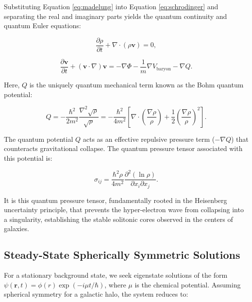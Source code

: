 Substituting Equation \ref{eq:madelung} into Equation \ref{eq:schrodinger} and separating the real and imaginary parts yields the quantum continuity and quantum Euler equations:

\begin{equation}
\frac{\partial \rho}{\partial t} + \nabla \cdot (\rho \mathbf{v}) = 0,
\label{eq:continuity}
\end{equation}

\begin{equation}
\frac{\partial \mathbf{v}}{\partial t} + (\mathbf{v} \cdot \nabla)\mathbf{v} = -\nabla \Phi - \frac{1}{m}\nabla V_{\text{baryon}} - \nabla Q.
\label{eq:euler}
\end{equation}

Here, $Q$ is the uniquely quantum mechanical term known as the Bohm quantum potential:

\begin{equation}
Q = -\frac{\hbar^2}{2m^2} \frac{\nabla^2 \sqrt{\rho}}{\sqrt{\rho}} = -\frac{\hbar^2}{4m^2} \left[ \nabla \cdot \left(\frac{\nabla \rho}{\rho}\right) + \frac{1}{2} \left(\frac{\nabla \rho}{\rho}\right)^2 \right].
\label{eq:quantum_potential}
\end{equation}

The quantum potential $Q$ acts as an effective repulsive pressure term ($-\nabla Q$) that counteracts gravitational collapse. The quantum pressure tensor associated with this potential is:

\begin{equation}
\sigma_{ij} = \frac{\hbar^2 \rho}{4m^2} \frac{\partial^2 (\ln \rho)}{\partial x_i \partial x_j}.
\end{equation}

It is this quantum pressure tensor, fundamentally rooted in the Heisenberg uncertainty principle, that prevents the hyper-electron wave from collapsing into a singularity, establishing the stable solitonic cores observed in the centers of galaxies.

\subsection{Steady-State Spherically Symmetric Solutions}

For a stationary background state, we seek eigenstate solutions of the form $\psi(\mathbf{r},t) = \phi(r) \exp(-i \mu t / \hbar)$, where $\mu$ is the chemical potential. Assuming spherical symmetry for a galactic halo, the system reduces to:

